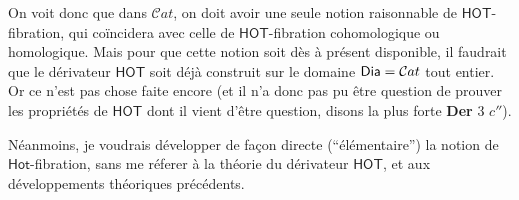 \documentclass[11pt,leqno]{article}
\newcommand{\Dia}{\ensuremath{\mathsf{Dia}}}
\newcommand{\Hot}{\ensuremath{\mathsf{Hot}}}
\newcommand{\HOT}{\ensuremath{\mathsf{HOT}}}
\newcommand{\Cat}{\ensuremath{\mathcal{C}at}}
\begin{document}
On voit donc que dans $\Cat$, on doit avoir une seule notion raisonnable de \HOT-fibration, qui coïncidera avec celle de \HOT-fibration cohomologique ou homologique. Mais pour que cette notion soit dès à présent disponible, il faudrait que le dérivateur \HOT{} soit déjà construit sur le domaine $\text{\Dia} = \Cat$ tout entier. Or ce n'est pas chose faite encore (et il n'a donc pas pu être question de prouver les propriétés de \HOT{} dont il vient d'être question, disons la plus forte \textbf{Der} 3 $c''$).

Néanmoins, je voudrais développer de façon directe (“élémentaire”) la notion de \Hot-fibration, sans me réferer à la théorie du dérivateur \HOT, et aux développements théoriques précédents. %
\end{document}
